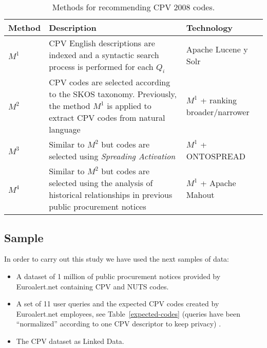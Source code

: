 \begin{table}[!htb]
\renewcommand{\arraystretch}{1.3}
\begin{center}
\begin{tabular}[c]{|l|p{8.5cm}|p{4.5cm}|} 
\hline
\textbf{Method} &  \textbf{Description} &  \textbf{Technology} \\\hline
$M^1$ & CPV English descriptions are indexed and a syntactic search process is performed for each $Q_i$ & Apache Lucene y Solr \\ \hline
$M^2$ & CPV codes are selected according to the SKOS taxonomy. Previously, the method $M^1$ is applied to extract CPV codes from natural language & $M^1$ + ranking broader/narrower \\ \hline
$M^3$ & Similar to $M^2$ but codes are selected using \textit{Spreading Activation}& $M^1$ + ONTOSPREAD \\ \hline
$M^4$ & Similar to $M^2$ but codes are selected using the analysis of historical relationships in previous public procurement notices & $M^1$ + Apache Mahout \\ \hline
 \end{tabular}
  \caption{Methods for recommending CPV 2008 codes.}\label{methods-recommending}  
    \end{center}
\end{table}


\subsection{Sample}
In order to carry out this study we have used the next samples of data:
\begin{itemize}
\item A dataset of 1 million of public procurement notices provided by Euroalert.net containing CPV and NUTS codes.
\item A set of 11 user queries and the expected CPV codes created by Euroalert.net employees, see Table~\ref{expected-codes} (queries have been ``normalized'' according to one CPV descriptor to keep privacy) .
\item The CPV dataset as Linked Data.
\end{itemize}



